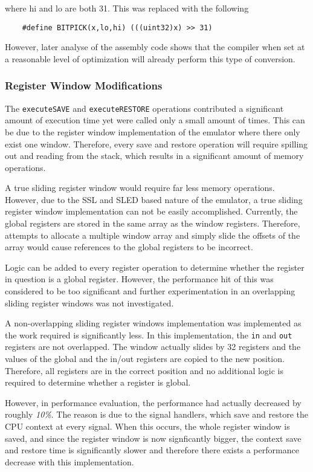 where hi and lo are both 31. This was replaced with the following 

\begin{verbatim}
    #define BITPICK(x,lo,hi) (((uint32)x) >> 31)
\end{verbatim}

However, later analyse of the assembly code shows that the compiler when
set at a reasonable level of optimization will already perform this type
of conversion.


\subsubsection*{Register Window Modifications}

The \verb!executeSAVE! and \verb!executeRESTORE! operations contributed a
significant amount of execution time yet were called only a small amount
of times. This can be due to the register window implementation of the
emulator where there only exist one window. Therefore, every save and
restore operation will require spilling out and reading from the stack,
which results in a significant amount of memory operations.

A true sliding register window would require far less memory operations.
However, due to the SSL and SLED based nature of the emulator, a true
sliding register window implementation can not be easily accomplished.
Currently, the global registers are stored in the same array as the window
registers. Therefore, attempts to allocate a multiple window array and
simply slide the offsets of the array would cause references to the global
registers to be incorrect.

Logic can be added to every register operation to determine whether the
register in question is a global register. However, the performance hit of
this was considered to be too significant and further experimentation in
an overlapping sliding register windows was not investigated.

A non-overlapping sliding register windows implementation was implemented
as the work required is significantly less. In this implementation, the
\verb!in! and \verb!out! registers are not overlapped. The window actually
slides by 32 registers and the values of the global and the in/out
registers are copied to the new position. Therefore, all registers are in
the correct position and no additional logic is required to determine
whether a register is global.

However, in performance evaluation, the performance had actually decreased
by roughly \emph{10\%}. The reason is due to the signal handlers, which
save and restore the CPU context at every signal. When this occurs, the
whole register window is saved, and since the register window is now
signficantly bigger, the context save and restore time is significantly
slower and therefore there exists a performance decrease with this
implementation.


